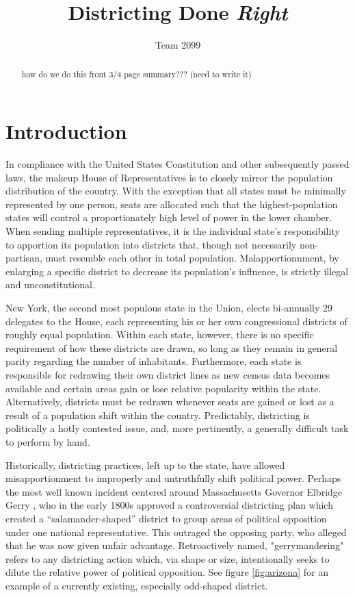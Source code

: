 \documentclass[11pt]{article}				%
\begin{document}
	\title{Districting Done {\it Right}}
	\author{Team 2099}


\maketitle
	\begin{abstract}
how do we do this front 3/4 page summary??? (need to write it)
	\end{abstract}



\section{Introduction}
In compliance with the United States Constitution and other subsequently
passed laws, the makeup House of Representatives is to closely mirror the 
population distribution of the country. With the exception that all
states must be minimally represented by one person, seats are allocated
such that the highest-population states will control a proportionately
high level of power in the lower chamber. When sending multiple
representatives, it is the individual state's responsibility to apportion 
its population into districts that, though not necessarily non-partisan,
must resemble each other in total population. Malapportionnment, by
enlarging a specific district to decrease its population's influence, is
strictly illegal and unconstitutional.

New York, the second most populous state in the Union, elects bi-annually 
29 delegates to the House, each representing his or her own congressional 
districts of roughly equal population. Within each state, however, there
is no specific requirement of how these districts are drawn, so long as
they remain in general parity regarding the number of inhabitants.
Furthermore, each state is responsible for redrawing their own district
lines as new census data becomes available and certain areas gain or lose 
relative popularity within the state. Alternatively, districts must be
redrawn whenever seats are gained or lost as a result of a population
shift within the country. Predictably, districting is politically a hotly 
contested issue, and, more pertinently, a generally difficult task to
perform by hand.

Historically, districting practices, left up to the state, have allowed
misapportionment to improperly and untruthfully shift political power.
Perhaps the most well known incident centered around Massachusetts
Governor Elbridge Gerry \cite{ref:gerry}, who in the early 1800s approved 
a controversial districting plan which created a “salamander-shaped”
district to group areas of political opposition under one national
representative. This outraged the opposing party, who alleged that he was 
now given unfair advantage. Retroactively named, "gerrymandering" refers
to any districting action which, via shape or size, intentionally seeks
to dilute the relative power of political opposition. See figure
\ref{fig:arizona} for an example of a currently existing, especially
odd-shaped district.
\end{document}
